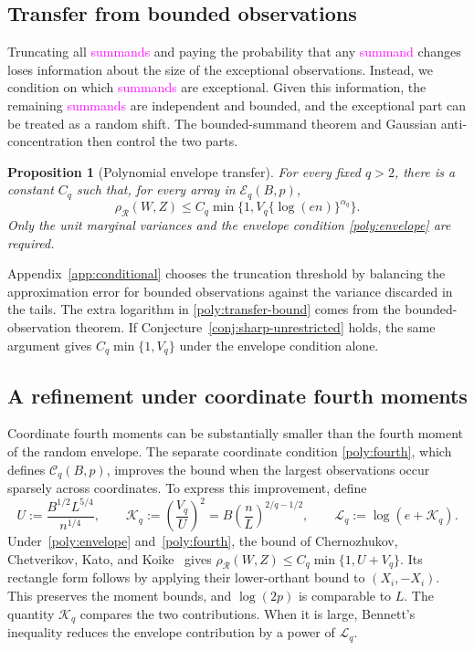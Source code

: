 \documentclass[11pt,letterpaper]{article}
\newtheorem{proposition}{Proposition}
\theoremstyle{remark}
\newcommand{\rh}{\rho_{\mathcal R}}
\begin{document}
\subsection{Transfer from bounded observations}\label{poly:transfer-sec}

Truncating all \textcolor{magenta}{summands} and paying the probability that any \textcolor{magenta}{summand} changes
loses information about the size of the exceptional observations.
Instead, we condition on which \textcolor{magenta}{summands} are exceptional. Given this
information, the remaining \textcolor{magenta}{summands} are independent and bounded, and the
exceptional part can be treated as a random shift. The bounded-summand
theorem and Gaussian anti-concentration then control the two parts.

\begin{proposition}[Polynomial envelope transfer]\label{poly:transfer}
For every fixed \(q>2\), there is a constant \(C_q\) such that, for
every array in \(\mathcal E_q(B,p)\),
\begin{equation}
 \rh(W,Z)\le C_q\min\{1,V_q\{\log(en)\}^{\alpha_q}\}.
 \label{poly:transfer-bound}
\end{equation}
Only the unit marginal variances and the envelope condition
\eqref{poly:envelope} are required.
\end{proposition}

Appendix~\ref{app:conditional} chooses the truncation threshold by
balancing the approximation error for bounded observations against the
variance discarded in the tails. The extra logarithm in
\eqref{poly:transfer-bound} comes from the bounded-observation theorem.
If Conjecture~\ref{conj:sharp-unrestricted} holds, the same argument
gives \(C_q\min\{1,V_q\}\) under the envelope condition alone.

\subsection{A refinement under coordinate fourth moments}\label{poly:bennett-sec}

Coordinate fourth moments can be substantially smaller than the fourth
moment of the random envelope. The separate coordinate condition
\eqref{poly:fourth}, which defines \(\mathcal C_q(B,p)\), improves
the bound when the largest observations occur sparsely across coordinates.
To express this improvement, define
\begin{equation}
 U:=\frac{B^{1/2}L^{5/4}}{n^{1/4}},\qquad
 \mathcal K_q:=\left(\frac{V_q}{U}\right)^2
     =B\left(\frac nL\right)^{2/q-1/2},\qquad
 \mathcal L_q:=\log(e+\mathcal K_q).
 \label{poly:bennett-parameters}
\end{equation}
Under~\eqref{poly:envelope} and~\eqref{poly:fourth}, the bound of
Chernozhukov, Chetverikov, Kato, and
Koike~\cite[Theorem~2.5]{CCKK2022} gives
\(\rh(W,Z)\le C_q\min\{1,U+V_q\}\).
Its rectangle form follows by applying their lower-orthant bound
to \((X_i,-X_i)\). This preserves the moment bounds, and
\(\log(2p)\) is comparable to \(L\).
The quantity \(\mathcal K_q\) compares the two contributions.
When it is large, Bennett's inequality reduces the envelope
contribution by a power of \(\mathcal L_q\).
\end{document}
